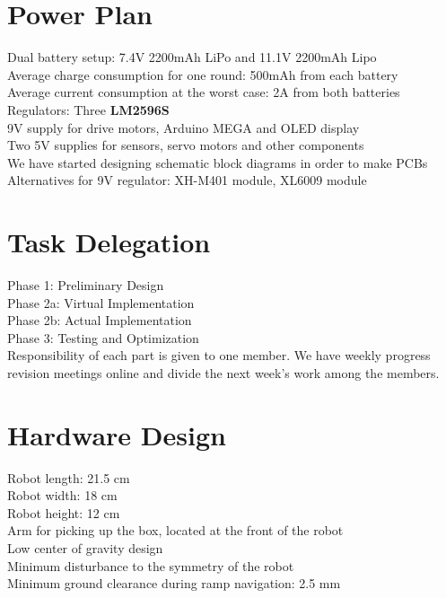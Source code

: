 \documentclass[a4paper, 12pt]{article}
\begin{document}
\section{Power Plan}
Dual battery setup: 7.4V 2200mAh LiPo and 11.1V 2200mAh Lipo\\
Average charge consumption for one round: 500mAh from each battery\\
Average current consumption at the worst case: 2A from both batteries\\
Regulators: Three \textbf{LM2596S}\\
9V supply for drive motors, Arduino MEGA and OLED display\\
Two 5V supplies for sensors, servo motors and other components\\
We have started designing schematic block diagrams in order to make PCBs\\
Alternatives for 9V regulator: XH-M401 module, XL6009 module

\section{Task Delegation}
Phase 1: Preliminary Design\\
Phase 2a: Virtual Implementation\\
Phase 2b: Actual Implementation\\
Phase 3: Testing and Optimization\\
Responsibility of each part is given to one member. We have weekly progress revision meetings online and divide the next week's work among the members.\\

\section{Hardware Design}
Robot length: 21.5 cm\\
Robot width: 18 cm\\
Robot height: 12 cm\\
Arm for picking up the box, located at the front of the robot\\
Low center of gravity design\\
Minimum disturbance to the symmetry of the robot\\
Minimum ground clearance during ramp navigation: 2.5 mm\\
\end{document}
